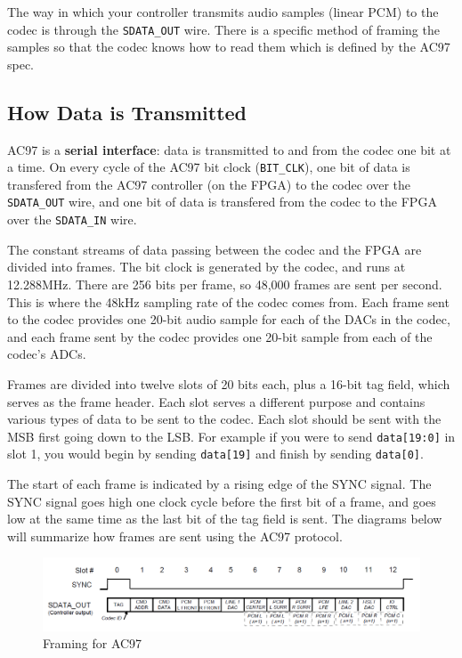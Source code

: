 \documentclass[11pt]{article}
\begin{document}
The way in which your controller transmits audio samples (linear PCM) to the codec is through the \verb|SDATA_OUT| wire. There is a specific method of framing the samples so that the codec knows how to read them which is defined by the AC97 spec.

\subsection{How Data is Transmitted}
AC97 is a \textbf{serial interface}: data is transmitted to and from the codec one bit at a time. On every cycle of the AC97 bit clock (\verb|BIT_CLK|), one bit of data is transfered from the AC97 controller (on the FPGA) to the codec over the \verb|SDATA_OUT| wire, and one bit of data is transfered from the codec to the FPGA over the \verb|SDATA_IN| wire.

The constant streams of data passing between the codec and the FPGA are divided into frames. The bit clock is generated by the codec, and runs at 12.288MHz. There are 256 bits per frame, so 48,000 frames are sent per second. This is where the 48kHz sampling rate of the codec comes from. Each frame sent to the codec provides one 20-bit audio sample for each of the DACs in the codec, and each frame sent by the codec provides one 20-bit sample from each of the codec's ADCs.

Frames are divided into twelve slots of 20 bits each, plus a 16-bit tag field, which serves as the frame header. Each slot serves a different purpose and contains various types of data to be sent to the codec. Each slot should be sent with the MSB first going down to the LSB. For example if you were to send \verb|data[19:0]| in slot 1, you would begin by sending \verb|data[19]| and finish by sending \verb|data[0]|.

The start of each frame is indicated by a rising edge of the SYNC signal. The SYNC signal goes high one clock cycle before the first bit of a frame, and goes low at the same time as the last bit of the tag field is sent. The diagrams below will summarize how frames are sent using the AC97 protocol.

\begin{figure}[hbt]
	\begin{center}
		\includegraphics[width=6in]{ac97_framing}
		\caption{Framing for AC97}
	\end{center}
\end{figure}
\end{document}
